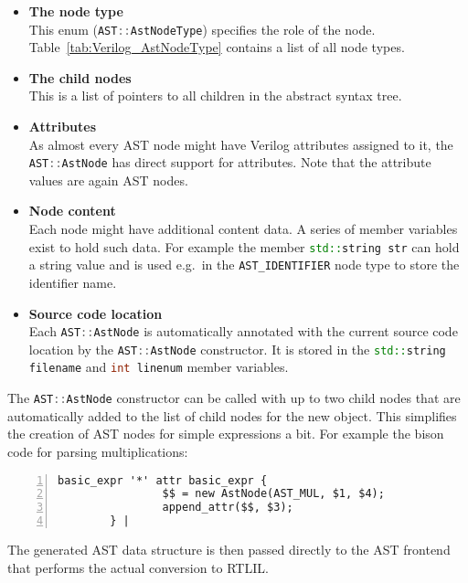 
\begin{itemize}
\item {\bf The node type} \\
This enum (\lstinline[language=C++]{AST::AstNodeType}) specifies the role of the node.
Table~\ref{tab:Verilog_AstNodeType} contains a list of all node types.
\item {\bf The child nodes} \\
This is a list of pointers to all children in the abstract syntax tree.
\item {\bf Attributes} \\
As almost every AST node might have Verilog attributes assigned to it, the
\lstinline[language=C++]{AST::AstNode} has direct support for attributes. Note that the
attribute values are again AST nodes.
\item {\bf Node content} \\
Each node might have additional content data. A series of member variables exist to hold such data.
For example the member \lstinline[language=C++]{std::string str} can hold a string value and is
used e.g.~in the {\tt AST\_IDENTIFIER} node type to store the identifier name.
\item {\bf Source code location} \\
Each \lstinline[language=C++]{AST::AstNode} is automatically annotated with the current
source code location by the \lstinline[language=C++]{AST::AstNode} constructor. It is
stored in the \lstinline[language=C++]{std::string filename} and \lstinline[language=C++]{int linenum}
member variables.
\end{itemize}

The \lstinline[language=C++]{AST::AstNode} constructor can be called with up to
two child nodes that are automatically added to the list of child nodes for the new object.
This simplifies the creation of AST nodes for simple expressions a bit. For example the bison
code for parsing multiplications:

\begin{lstlisting}[numbers=left,frame=single]
        basic_expr '*' attr basic_expr {
                $$ = new AstNode(AST_MUL, $1, $4);
                append_attr($$, $3);
        } |
\end{lstlisting}

The generated AST data structure is then passed directly to the AST frontend
that performs the actual conversion to RTLIL.

